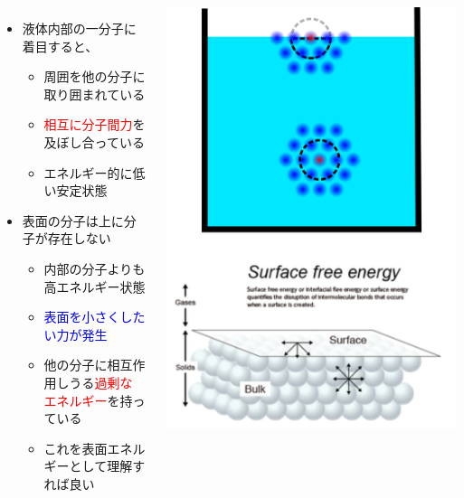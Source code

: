 \documentclass[12pt, dvipdfmx]{beamer}
\begin{document}
\begin{frame}
	\begin{columns}[c, onlytextwidth]
			\begin{itemize}
				\item 液体内部の一分子に着目すると、
				\begin{itemize}
					\item 周囲を他の分子に取り囲まれている
					\item \textcolor{red}{相互に分子間力}を及ぼし合っている
					\item エネルギー的に低い安定状態
				\end{itemize}
				\item 表面の分子は上に分子が存在しない
				\begin{itemize}
					\item 内部の分子よりも高エネルギー状態
					\item \textcolor{blue}{表面を小さくしたい力が発生}
					\item 他の分子に相互作用しうる\textcolor{red}{過剰な\\エネルギー}を持っている
					\item これを表面エネルギーとして理解すれば良い
				\end{itemize}
			\end{itemize}
		\centering
		\includegraphics[width=\textwidth]{surface.png}
	\end{columns}
\end{frame}
\end{document}
